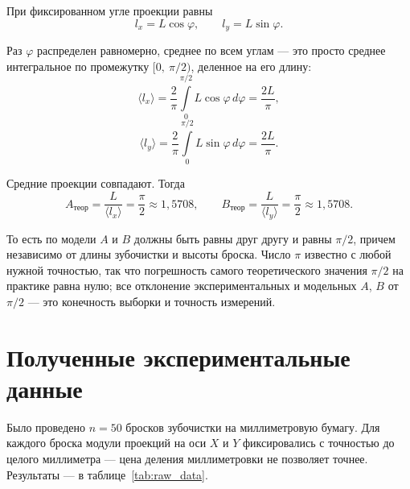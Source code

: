 \documentclass[a4paper, 14pt]{extarticle}
\begin{document}
При фиксированном угле проекции равны
\begin{equation}
  l_x = L \cos\varphi, \qquad
  l_y = L \sin\varphi.
  \label{eq:proj}
\end{equation}

Раз $\varphi$ распределен равномерно, среднее по всем углам --- это просто
среднее интегральное по промежутку $[0,\ \pi/2)$, деленное на его длину:
\begin{equation}
  \langle l_x \rangle
  = \frac{2}{\pi}\int\limits_{0}^{\pi/2} L\cos\varphi\,d\varphi
  = \frac{2L}{\pi},
  \label{eq:mean_lx}
\end{equation}
\begin{equation}
  \langle l_y \rangle
  = \frac{2}{\pi}\int\limits_{0}^{\pi/2} L\sin\varphi\,d\varphi
  = \frac{2L}{\pi}.
  \label{eq:mean_ly}
\end{equation}

Средние проекции совпадают. Тогда
\begin{equation}
  A_{\text{теор}} = \frac{L}{\langle l_x \rangle} = \frac{\pi}{2}
  \approx 1{,}5708,
  \qquad
  B_{\text{теор}} = \frac{L}{\langle l_y \rangle} = \frac{\pi}{2}
  \approx 1{,}5708.
  \label{eq:AB_theor}
\end{equation}

То есть по модели $A$ и $B$ должны быть равны друг другу и равны $\pi/2$,
причем независимо от длины зубочистки и высоты броска. Число $\pi$ известно
с любой нужной точностью, так что погрешность самого теоретического
значения $\pi/2$ на практике равна нулю; все отклонение экспериментальных
и модельных $A$, $B$ от $\pi/2$ --- это конечность выборки и точность измерений.

\section*{Полученные экспериментальные данные}

Было проведено $n = 50$ бросков зубочистки на миллиметровую бумагу. Для
каждого броска модули проекций на оси $X$ и $Y$ фиксировались с точностью
до целого миллиметра --- цена деления миллиметровки не позволяет точнее.
Результаты --- в таблице~\ref{tab:raw_data}.
\end{document}
